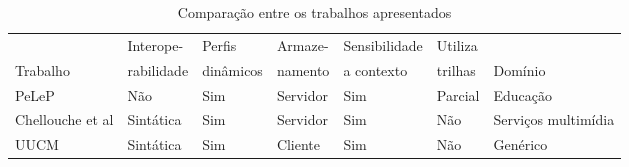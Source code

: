 \begin{table}\centering\footnotesize
  \begin{tabular*}{1\textwidth}{@{}lllllll@{}}
    \toprule
                                         & Interope-  & Perfis    & Armaze-  & Sensibilidade & Utiliza & \\
    Trabalho                             & rabilidade & dinâmicos & namento  & a contexto    & trilhas & Domínio \\
    \midrule
    PeLeP \cite{pelep}                   & Não        & Sim       & Servidor & Sim           & Parcial & Educação \\
    Chellouche et al \cite{chellouche10} & Sintática  & Sim       & Servidor & Sim           & Não     & Serviços multimídia \\
    UUCM \cite{niederee04}               & Sintática  & Sim       & Cliente  & Sim           & Não     & Genérico \\
    \bottomrule
  \end{tabular*}
  \caption{Comparação entre os trabalhos apresentados}
  \label{tab:comparacao}
\end{table}

